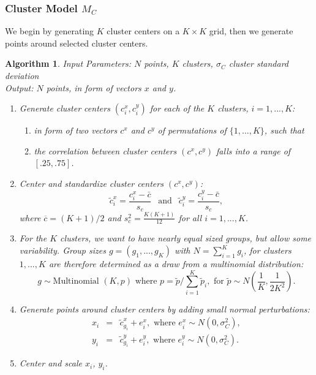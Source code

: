 \documentclass[11pt]{isuthesis}\usepackage[]{graphicx}\usepackage[]{color}
\newtheorem{algorithm}[theorem]{Algorithm}
\begin{document}
\subsubsection{Cluster Model $M_C$} 
We begin by generating $K$ cluster centers on a $K \times K$ grid, then we generate points around selected cluster centers. 
\begin{algorithm}\hfill\newline
  Input Parameters:  $N$ points, $K$ clusters, $\sigma_C$ cluster standard deviation \\
  Output: $N$ points, in form of vectors $x$ and $y$. 
  \begin{enumerate}
    \item Generate cluster centers $(c^x_{i}, c^y_{i})$ for each of the $K$ clusters, $i=1, ..., K$:
      \begin{enumerate}
        \item in form of two vectors $c^{x}$ and $c^y$ of permutations of $\{1, ..., K\}$, such that
        \item the correlation between cluster centers $(c^{x}, c^{y})$ falls into a range of $[.25, .75]$.
      \end{enumerate}
      \item Center and standardize cluster centers $(c^x, c^y)$:  
      \[
        \tilde{c}^x_{i} = \frac{c^x_{i} - \bar{c}}{s_c} \ \ \text{ and } \ \ \tilde{c}^y_{i} = \frac{c^y_{i} - \bar{c}}{s_c},
      \]
      where $\overline{c} = (K+1)/2$ and $s_c^2 = \frac{K(K+1)}{12}$ for all $i = 1, ..., K$.
    \item For the $K$ clusters, we want to have nearly equal sized groups, but allow some variability. Group sizes  $g = (g_1, ..., g_K)$ with $N = \sum_{i=1}^K g_i$, for clusters $1, ..., K$ are therefore determined as a draw from a multinomial distribution: 
    \[
    g \sim \text{Multinomial }(K, p) \text{ where } p = \tilde{p}/\sum_{i=1}^K \tilde{p}_i, \text{ for } \tilde{p} \sim N \left(\frac{1}{K}, \frac{1}{2 K^2} \right).
    \]
     
    \item Generate points around cluster centers by adding small normal perturbations: 
      \begin{eqnarray*}
        x_i &=& \tilde{c}^x_{g_i} + e^x_i, \text{ where } e^x_i \sim N(0, \sigma^2_C),\\
        y_i &=& \tilde{c}^y_{g_i} + e^y_i, \text{ where } e^y_i \sim N(0, \sigma^2_C).
      \end{eqnarray*}
    \item Center and scale $x_i$, $y_i$.
  \end{enumerate}
\end{algorithm} 
\end{document}
